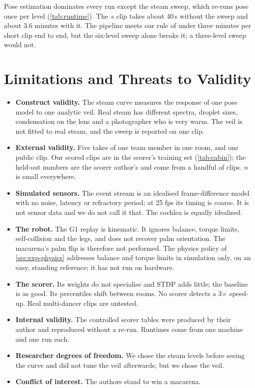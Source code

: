\documentclass[10pt]{article}
\begin{document}
Pose estimation dominates every run except the steam sweep, which re-runs pose once per level (\cref{tab:runtime}). The \SoloSeconds\,s clip takes about 40\,s without the sweep and about 3.6 minutes with it. The pipeline meets our rule of under three minutes per short clip end to end, but the six-level sweep alone breaks it; a three-level sweep would not.

\section{Limitations and Threats to Validity}
\label{sec:limits}

\begin{itemize}
  \item \textbf{Construct validity.} The steam curve measures the response of one pose model to one analytic veil. Real steam has different spectra, droplet sizes, condensation on the lens and a photographer who is very warm. The veil is not fitted to real steam, and the sweep is reported on one clip.
  \item \textbf{External validity.} Five takes of one team member in one room, and one public clip. Our scored clips are in the scorer's training set (\cref{tab:cabin}); the held-out numbers are the scorer author's and come from a handful of clips. $n$ is small everywhere.
  \item \textbf{Simulated sensors.} The event stream is an idealised frame-difference model with no noise, latency or refractory period; at 25 fps its timing is coarse. It is not sensor data and we do not call it that. The cochlea is equally idealised.
  \item \textbf{The robot.} The G1 replay is kinematic. It ignores balance, torque limits, self-collision and the legs, and does not recover palm orientation. The macarena's palm flip is therefore not performed. The physics policy of \cref{sec:exp-physics} addresses balance and torque limits in simulation only, on an easy, standing reference; it has not run on hardware.
  \item \textbf{The scorer.} Its weights do not specialise and STDP adds little; the baseline is as good. Its percentiles shift between rooms. No scorer detects a 3$\times$ speed-up. Real multi-dancer clips are untested.
  \item \textbf{Internal validity.} The controlled scorer tables were produced by their author and reproduced without a re-run. Runtimes come from one machine and one run each.
  \item \textbf{Researcher degrees of freedom.} We chose the steam levels before seeing the curve and did not tune the veil afterwards; but we chose the veil.
  \item \textbf{Conflict of interest.} The authors stand to win a macarena.
\end{itemize}
\end{document}
